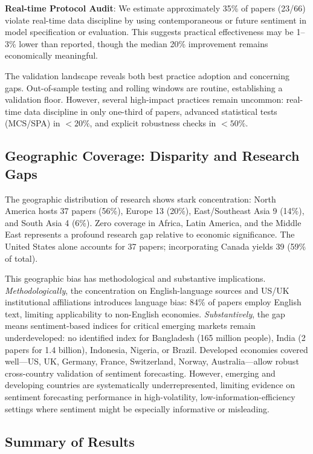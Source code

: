 \documentclass[11pt]{article}
\begin{document}
\footnotesize \textbf{Real-time Protocol Audit}: We estimate approximately 35\% of papers (23/66) violate real-time data discipline by using contemporaneous or future sentiment in model specification or evaluation. This suggests practical effectiveness may be 1--3\% lower than reported, though the median 20\% improvement remains economically meaningful.\normalsize

\normalsize The validation landscape reveals both best practice adoption and concerning gaps. Out-of-sample testing and rolling windows are routine, establishing a validation floor. However, several high-impact practices remain uncommon: real-time data discipline in only one-third of papers, advanced statistical tests (MCS/SPA) in $<20\%$, and explicit robustness checks in $<50\%$.

\subsection{Geographic Coverage: Disparity and Research Gaps}

The geographic distribution of research shows stark concentration: North America hosts 37 papers (56\%), Europe 13 (20\%), East/Southeast Asia 9 (14\%), and South Asia 4 (6\%). Zero coverage in Africa, Latin America, and the Middle East represents a profound research gap relative to economic significance. The United States alone accounts for 37 papers; incorporating Canada yields 39 (59\% of total).

This geographic bias has methodological and substantive implications. \emph{Methodologically}, the concentration on English-language sources and US/UK institutional affiliations introduces language bias: 84\% of papers employ English text, limiting applicability to non-English economies. \emph{Substantively}, the gap means sentiment-based indices for critical emerging markets remain underdeveloped: no identified index for Bangladesh (165 million people), India (2 papers for 1.4 billion), Indonesia, Nigeria, or Brazil. Developed economies covered well---US, UK, Germany, France, Switzerland, Norway, Australia---allow robust cross-country validation of sentiment forecasting. However, emerging and developing countries are systematically underrepresented, limiting evidence on sentiment forecasting performance in high-volatility, low-information-efficiency settings where sentiment might be especially informative or misleading.

\subsection{Summary of Results}
\end{document}
